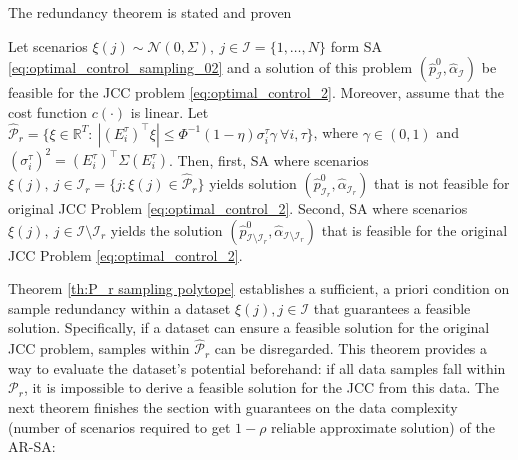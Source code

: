 
The redundancy theorem is stated and proven
\begin{theorem}
Let scenarios $\xi(j) \sim \mathcal{N}(0, \Sigma), ~ j \in \mathcal{I}=\{1, \dots, N\}$ form SA \eqref{eq:optimal_control_sampling_02} and a solution of this problem $(\hat{p}^0_{\mathcal{I}}, \hat{\alpha}_{\mathcal{I}})$ be feasible for the JCC problem \eqref{eq:optimal_control_2}. Moreover, assume that the cost function $c(\cdot)$ is linear.  Let $\hat{\mathcal{P}}_r = \{ \xi\in \mathbb{R}^T:~ |(E^{\tau}_i)^\top \xi|  \leq \Phi^{-1}(1 - \eta) \sigma^\tau_i \gamma ~\forall i, \tau \}$, where $\gamma \in (0, 1)$ and $(\sigma^\tau_i)^2 = (E^\tau_i)^\top \Sigma (E^\tau_i)$.
Then, first, SA  where scenarios $\xi(j), ~ j \in \mathcal{I}_r = \{ j: \xi(j) \in \hat{\mathcal{P}}_r \}$ yields solution $(\hat{p}^0_{\mathcal{I}_r}, \hat{\alpha}_{\mathcal{I}_r})$ that is not feasible for original JCC Problem \eqref{eq:optimal_control_2}. Second, SA where scenarios $\xi(j), ~ j \in \mathcal{I} \setminus \mathcal{I}_r$ yields the solution $(\hat{p}^0_{\mathcal{I} \setminus \mathcal{I}_r}, \hat{\alpha}_{\mathcal{I} \setminus \mathcal{I}_r})$ that is feasible for the original JCC Problem \eqref{eq:optimal_control_2}.
\label{th:P_r sampling polytope}
\end{theorem}

Theorem \ref{th:P_r sampling polytope} establishes a sufficient, a priori condition on sample redundancy within a dataset $\xi(j), j \in \mathcal{I}$ that guarantees a feasible solution. Specifically, if a dataset can ensure a feasible solution for the original JCC problem, samples within $\hat{\mathcal{P}}_r$ can be disregarded. This theorem provides a way to evaluate the dataset's potential beforehand: if all data samples fall within $\mathcal{P}_r$, it is impossible to derive a feasible solution for the JCC from this data.
The next theorem finishes the section with guarantees on the data complexity (number of scenarios required to get $1-\rho$ reliable approximate solution) of the AR-SA:

